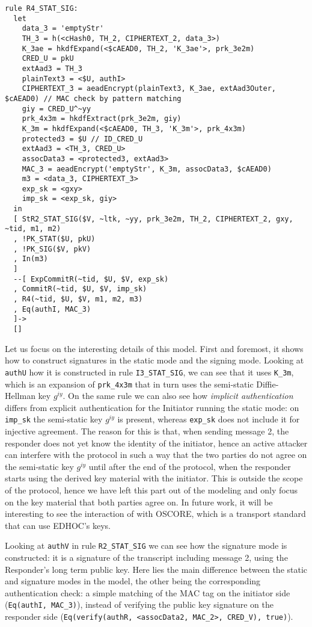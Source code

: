 \begin{lstlisting}
rule R4_STAT_SIG:
  let
    data_3 = 'emptyStr'
    TH_3 = h(<cHash0, TH_2, CIPHERTEXT_2, data_3>)
    K_3ae = hkdfExpand(<$cAEAD0, TH_2, 'K_3ae'>, prk_3e2m)
    CRED_U = pkU
    extAad3 = TH_3
    plainText3 = <$U, authI>
    CIPHERTEXT_3 = aeadEncrypt(plainText3, K_3ae, extAad3Outer, $cAEAD0) // MAC check by pattern matching
    giy = CRED_U^~yy
    prk_4x3m = hkdfExtract(prk_3e2m, giy)
    K_3m = hkdfExpand(<$cAEAD0, TH_3, 'K_3m'>, prk_4x3m)
    protected3 = $U // ID_CRED_U
    extAad3 = <TH_3, CRED_U>
    assocData3 = <protected3, extAad3>
    MAC_3 = aeadEncrypt('emptyStr', K_3m, assocData3, $cAEAD0)
    m3 = <data_3, CIPHERTEXT_3>
    exp_sk = <gxy>
    imp_sk = <exp_sk, giy>
  in
  [ StR2_STAT_SIG($V, ~ltk, ~yy, prk_3e2m, TH_2, CIPHERTEXT_2, gxy, ~tid, m1, m2) 
  , !PK_STAT($U, pkU)
  , !PK_SIG($V, pkV)
  , In(m3)
  ]
  --[ ExpCommitR(~tid, $U, $V, exp_sk)
  , CommitR(~tid, $U, $V, imp_sk)
  , R4(~tid, $U, $V, m1, m2, m3)
  , Eq(authI, MAC_3)
  ]->
  []
\end{lstlisting}

Let us focus on the interesting details of this model. First and
foremost, it shows how to construct signatures in the static mode and
the signing mode.
%
Looking at \lstinline{authU} how it is constructed in rule
\lstinline{I3_STAT_SIG}, we can see that it uses \lstinline{K_3m},
which is an expansion of \lstinline{prk_4x3m} that in turn uses the
semi-static Diffie-Hellman key $g^{iy}$.
%
On the same rule we can also see how \emph{implicit authentication}
differs from explicit authentication for the Initiator running the
static mode: on \lstinline{imp_sk} the semi-static key
$g^{iy}$ is present, whereas \lstinline{exp_sk} does not include it
for injective agreement.
%
The reason for this is that, when sending message 2, the responder
does not yet know the identity of the initiator, hence an active
attacker can interfere with the protocol in such a way that the two
parties do not agree on the semi-static key
$g^{iy}$ until after the end of the protocol, when the responder
starts using the derived key material with the initiator.
%
This is outside the scope of the \mEdhoc protocol, hence we have left
this part out of the modeling and only focus on the key material that
both parties agree on.
%
In future work, it will be interesting to see the interaction of
\mEdhoc with OSCORE, which is a transport standard that can use
EDHOC's keys.

Looking at \lstinline{authV} in rule \lstinline{R2_STAT_SIG} we can
see how the signature mode is constructed: it is a signature of the
transcript including message 2, using the Responder's long term public
key.
%
Here lies the main difference between the static and signature modes
in the model, the other being the corresponding authentication check:
a simple matching of the MAC tag on the initiator side
%
(\lstinline{Eq(authI, MAC_3)}), instead of verifying the public key
signature on the responder side
%
(\lstinline{Eq(verify(authR, <assocData2, MAC_2>, CRED_V), true)}).

